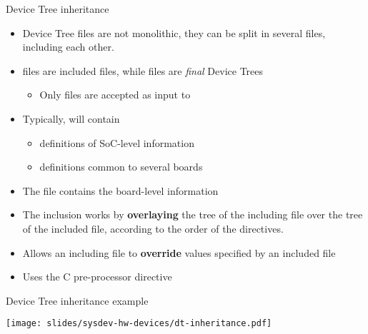 \begin{frame}[fragile]{Device Tree inheritance}
  \begin{itemize}
  \item Device Tree files are not monolithic, they can be split in
    several files, including each other.
  \item {} files are included files, while  files
    are {\em final} Device Trees
    \begin{itemize}
    \item Only  files are accepted as input to 
    \end{itemize}
  \item Typically,  will contain
    \begin{itemize}
    \item definitions of SoC-level information
    \item definitions common to several boards
    \end{itemize}
  \item The  file contains the board-level information
  \item The inclusion works by {\bf overlaying} the tree of the
    including file over the tree of the included file,
    according to the order of the  directives. 
  \item Allows an including file to {\bf override} values specified by
    an included file
  \item Uses the C pre-processor  directive
  \end{itemize}
\end{frame}

\begin{frame}{Device Tree inheritance example}
  \begin{center}
    \texttt{[image: slides/sysdev-hw-devices/dt-inheritance.pdf]}
  \end{center}
\end{frame}

